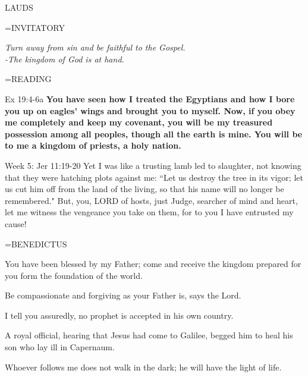 \begin{flushleft}\normalsize LAUDS\\\end{flushleft}
\hangindent=\parindent \small{INVITATORY}
\begin{center}
\textit{Turn away from sin and be faithful to the Gospel.\\}
\textit{-The kingdom of God is at hand.\\}
\end{center}

\hangindent=\parindent \small READING
\begin{description}[labelindent=\parindent, leftmargin=*]
\item [Week 1-4:]   Ex 19:4-6a \textbf{  You have seen how I treated the Egyptians and how I bore you up on eagles’ wings and brought you to myself. Now, if you obey me completely and keep my covenant, you will be my treasured possession among all peoples, though all the earth is mine. You will be to me a kingdom of priests, a holy nation.\\}
\end{description}

Week 5:  Jer 11:19-20  Yet I was like a trusting lamb led to slaughter, not knowing that they were hatching plots against me: “Let us destroy the tree in its vigor; let us cut him off from the land of the living, so that his name will no longer be remembered." But, you, LORD of hosts, just Judge, searcher of mind and heart, let me witness the vengeance you take on them, for to you I have entrusted my cause!

\hangindent=\parindent \small BENEDICTUS
\begin{description}[labelindent=\parindent, leftmargin=*]
\item [Week 1:] 	You have been blessed by my Father; come and receive the kingdom prepared for you form the foundation of the world.
\item [Week 2:] 	Be compassionate and forgiving as your Father is, says the Lord.
\item [Week 3:] 	I tell you assuredly, no prophet is accepted in his own country.
\item [Week 4:] 	A royal official, hearing that Jesus had come to Galilee, begged him to heal his son who lay ill in Capernaum.
\item [Week 5:] 	Whoever follows me does not walk in the dark; he will have the light of life.
\end{description}

